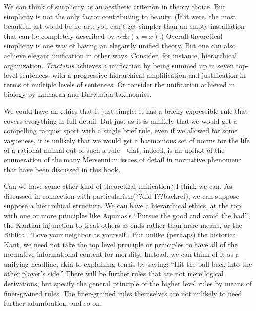 We can think of simplicity as an aesthetic criterion in theory choice. But simplicity is not the only factor contributing
to beauty. (If it were, the most beautiful art would be no art: you can't get simpler than an empty installation that can be 
completely described by $\sim\exists x(x=x)$.) Overall theoretical simplicity is one way of having an elegantly unified
theory. But one can also achieve elegant unification in other ways. Consider, for instance, hierarchical organization. 
\textit{Tractatus} achieves a unification by being summed up in seven top-level sentences, with a progressive hierarchical
amplification and justification in terms of multiple levels of sentences. Or consider the unification achieved in biology by
Linnaean and Darwinian taxonomies.

We could have an ethics that is just simple: it has a briefly expressible rule that covers everything in full detail. But 
just as it is unlikely that we would get a compelling racquet sport with a single brief rule, even if we allowed for some
vagueness, it is unlikely that we would get a harmonious set of norms for the life of a rational animal out of such a rule---that, 
indeed, is an upshot of the enumeration of the many Mersennian issues of detail in normative phenomena that have been discussed
in this book. 

Can we have some other kind of theoretical unification? I think we can. As discussed in connection with particularism(??did I??backref),
we can suppose suppose a hierarchical structure. We can have a hierarchical ethics, at the top with one or more principles like Aquinas's ``Pursue the good
and avoid the bad'', the Kantian injunction to treat others as ends rather than mere means, or the Biblical ``Love your neighbor as yourself''.
But unlike (perhaps) the historical Kant, we need not take the top level principle or principles to have all of the normative informational 
content for morality. Instead, we can think of it as a unifying headline, akin to explaining tennis by saying: ``Hit the ball back into the
other player's side.'' There will be further rules that are not mere logical derivations, but specify the general principle of 
the higher level rules by means of finer-grained rules. The finer-grained rules themselves are not unlikely to need further adumbration, and so on.

